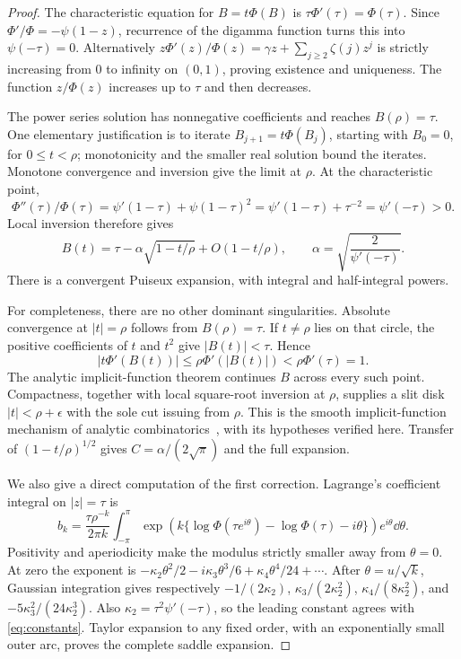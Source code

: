 \begin{proof}
The characteristic equation for \(B=t\Phi(B)\) is
\(\tau\Phi'(\tau)=\Phi(\tau)\).
Since \(\Phi'/\Phi=-\psi(1-z)\), recurrence of the digamma function
turns this into \(\psi(-\tau)=0\).
Alternatively \(z\Phi'(z)/\Phi(z)=\gamma z+\sum_{j\geq2}\zeta(j)z^j\)
is strictly increasing from 0 to infinity on \((0,1)\), proving
existence and uniqueness. The function \(z/\Phi(z)\) increases up to
\(\tau\) and then decreases.

The power series solution has nonnegative coefficients and reaches
\(B(\rho)=\tau\). One elementary justification is to iterate
\(B_{j+1}=t\Phi(B_j)\), starting with \(B_0=0\), for \(0\leq t<\rho\);
monotonicity and the smaller real solution bound the iterates.
Monotone convergence and inversion give the limit at \(\rho\).
At the characteristic point,
\[
 \Phi''(\tau)/\Phi(\tau)
 =\psi'(1-\tau)+\psi(1-\tau)^2
 =\psi'(1-\tau)+\tau^{-2}=\psi'(-\tau)>0.
\]
Local inversion therefore gives
\begin{equation}\label{eq:puiseux}
 B(t)=\tau-\alpha\sqrt{1-t/\rho}+O(1-t/\rho),
 \qquad \alpha=\sqrt{\frac2{\psi'(-\tau)}}.
\end{equation}
There is a convergent Puiseux expansion, with integral and half-integral
powers.

For completeness, there are no other dominant singularities.
Absolute convergence at \(|t|=\rho\) follows from \(B(\rho)=\tau\).
If \(t\neq\rho\) lies on that circle, the positive coefficients of
\(t\) and \(t^2\) give \(|B(t)|<\tau\). Hence
\[
 |t\Phi'(B(t))|\leq\rho\Phi'(|B(t)|)<\rho\Phi'(\tau)=1.
\]
The analytic implicit-function theorem continues \(B\) across every such
point. Compactness, together with local square-root inversion at \(\rho\),
supplies a slit disk \(|t|<\rho+\epsilon\) with the sole cut issuing from
\(\rho\). This is the smooth implicit-function mechanism of
analytic combinatorics~\cite{FS}, with its hypotheses verified here.
Transfer of \((1-t/\rho)^{1/2}\) gives
\(C=\alpha/(2\sqrt\pi)\) and the full expansion.

We also give a direct computation of the first correction.
Lagrange's coefficient integral on \(|z|=\tau\) is
\[
 b_k=\frac{\tau\rho^{-k}}{2\pi k}
 \int_{-\pi}^{\pi}
 \exp\!\left(k\{\log\Phi(\tau e^{i\theta})-\log\Phi(\tau)-i\theta\}\right)
 e^{i\theta}\dd\theta.
\]
Positivity and aperiodicity make the modulus strictly smaller away from
\(\theta=0\). At zero the exponent is
\(-\kappa_2\theta^2/2-i\kappa_3\theta^3/6
 +\kappa_4\theta^4/24+\cdots\).
After \(\theta=u/\sqrt{k}\), Gaussian integration gives respectively
\(-1/(2\kappa_2)\), \(\kappa_3/(2\kappa_2^2)\),
\(\kappa_4/(8\kappa_2^2)\), and
\(-5\kappa_3^2/(24\kappa_2^3)\).
Also \(\kappa_2=\tau^2\psi'(-\tau)\), so the leading constant agrees
with \eqref{eq:constants}. Taylor expansion to any fixed order, with an
exponentially small outer arc, proves the complete saddle expansion.
\end{proof}

